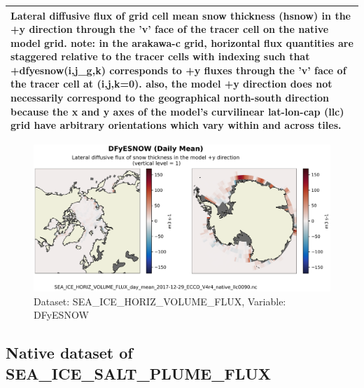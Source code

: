 \begin{longtable}{|m{}|m{}|m{}|m{}|}
\multicolumn{4}{|p{1\textwidth}|}{\footnotesize{{Lateral diffusive flux of grid cell mean snow thickness (hsnow) in the +y direction through the 'v' face of the tracer cell on the native model grid. note: in the arakawa-c grid, horizontal flux quantities are staggered relative to the tracer cells with indexing such that +dfyesnow(i,j\_g,k) corresponds to +y fluxes through the 'v' face of the tracer cell at (i,j,k=0). also, the model +y direction does not necessarily correspond to the geographical north-south direction because the x and y axes of the model's curvilinear lat-lon-cap (llc) grid have arbitrary orientations which vary within and across tiles.}}} \\ \hline
\end{longtable}

\begin{figure}[H]
\centering
\includegraphics[scale=0.55]{../images/plots/v4r4/native_plots/Sea-Ice_and_Snow_Horizontal_Volume_Fluxes/DFyESNOW.png}
\caption{Dataset: SEA\_ICE\_HORIZ\_VOLUME\_FLUX, Variable: DFyESNOW}
\label{tab:table-SEA_ICE_HORIZ_VOLUME_FLUX_DFyESNOW-Plot}
\end{figure}
\newpage
\subsection{Native dataset of SEA\_ICE\_SALT\_PLUME\_FLUX}
\newp
